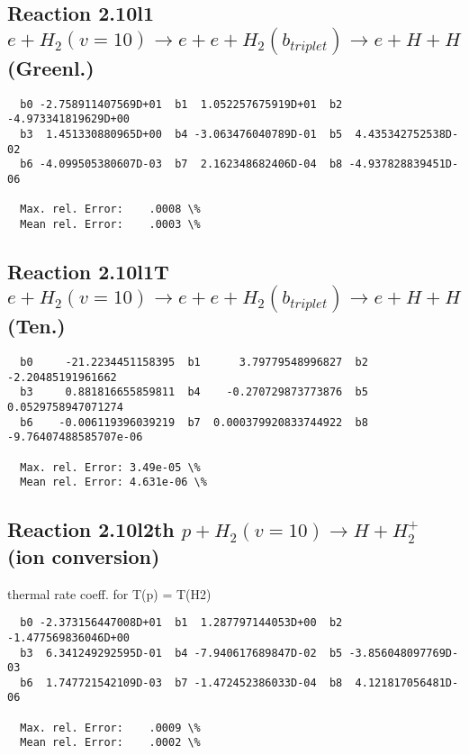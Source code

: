 \documentclass[12pt,dvipdfmx]{article}
\begin{document}
\newpage
\subsection{
Reaction 2.10l1
$ e + H_2(v=10) \rightarrow e + e+ H_2(b_{triplet})\rightarrow e + H + H $ (Greenl.)
}


\begin{small}\begin{verbatim}
  b0 -2.758911407569D+01  b1  1.052257675919D+01  b2 -4.973341819629D+00
  b3  1.451330880965D+00  b4 -3.063476040789D-01  b5  4.435342752538D-02
  b6 -4.099505380607D-03  b7  2.162348682406D-04  b8 -4.937828839451D-06

  Max. rel. Error:    .0008 \%
  Mean rel. Error:    .0003 \%
\end{verbatim}\end{small}


\subsection{
Reaction 2.10l1T
$ e +  H_2(v=10) \rightarrow e + e+ H_2(b_{triplet})\rightarrow e + H + H $ (Ten.)
}


\begin{small}\begin{verbatim}
  b0     -21.2234451158395  b1      3.79779548996827  b2     -2.20485191961662
  b3     0.881816655859811  b4    -0.270729873773876  b5    0.0529758947071274
  b6    -0.006119396039219  b7  0.000379920833744922  b8 -9.76407488585707e-06

  Max. rel. Error: 3.49e-05 \%
  Mean rel. Error: 4.631e-06 \%
\end{verbatim}\end{small}


\subsection{
Reaction 2.10l2th
$ p + H_2(v=10) \rightarrow H + H_2^+$ (ion conversion)
}
thermal rate coeff. for T(p) = T(H2)

\begin{small}\begin{verbatim}
  b0 -2.373156447008D+01  b1  1.287797144053D+00  b2 -1.477569836046D+00
  b3  6.341249292595D-01  b4 -7.940617689847D-02  b5 -3.856048097769D-03
  b6  1.747721542109D-03  b7 -1.472452386033D-04  b8  4.121817056481D-06

  Max. rel. Error:    .0009 \%
  Mean rel. Error:    .0002 \%
\end{verbatim}\end{small}
\end{document}
